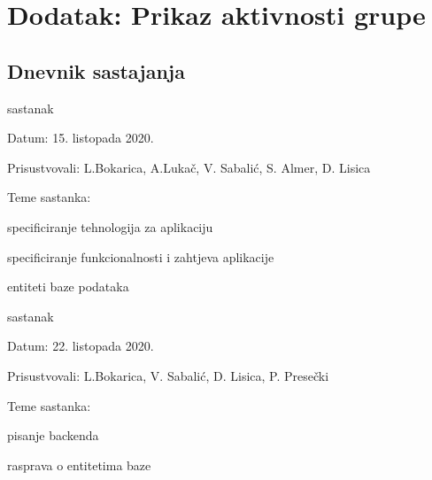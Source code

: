 \chapter*{Dodatak: Prikaz aktivnosti grupe}
		
		\section*{Dnevnik sastajanja}
		
		
		\begin{packed_enum}
			\item  sastanak
			
			\item[] \begin{packed_item}
				\item Datum: 15. listopada 2020.
				\item Prisustvovali: L.Bokarica, A.Lukač, V. Sabalić, S. Almer, D. Lisica
				\item Teme sastanka:
				\begin{packed_item}
					\item specificiranje tehnologija za aplikaciju
					\item   specificiranje funkcionalnosti i zahtjeva aplikacije
					\item  entiteti baze podataka
				\end{packed_item}
			\end{packed_item}
			
			\item  sastanak
			\item[] \begin{packed_item}
				\item Datum: 22. listopada 2020.
				\item Prisustvovali: L.Bokarica, V. Sabalić, D. Lisica, P. Presečki
				\item Teme sastanka:
				\begin{packed_item}
					\item  pisanje backenda
					\item  rasprava o entitetima baze
				\end{packed_item}
			\end{packed_item}
		

\end{packed_enum}
